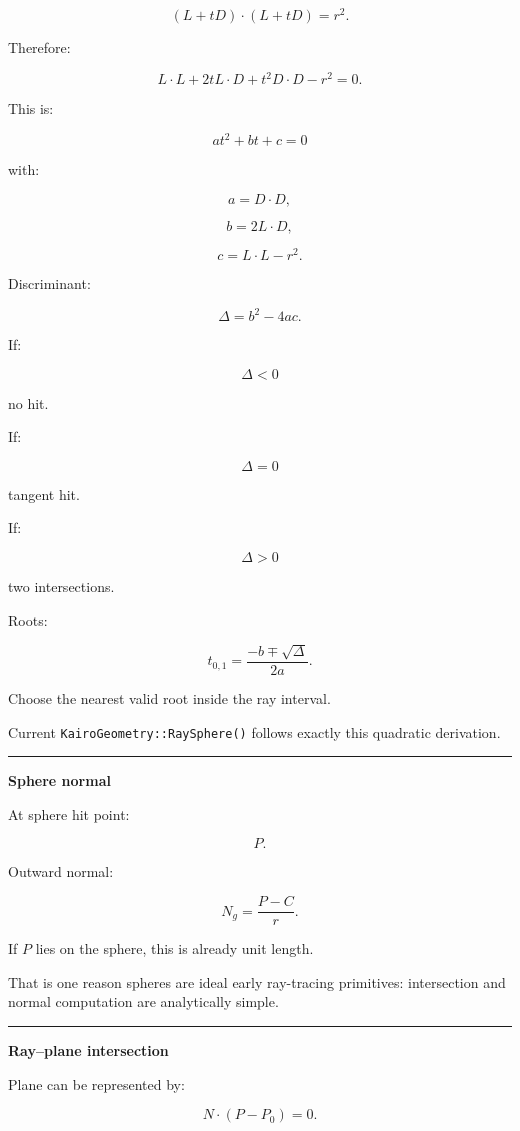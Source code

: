 \[
(L+tD)\cdot(L+tD)=r^2.
\]

Therefore:

\[
L\cdot L
+
2tL\cdot D
+
t^2D\cdot D
-
r^2
=
0.
\]

This is:

\[
\boxed{
at^2+bt+c=0
}
\]

with:

\[
a=D\cdot D,
\]

\[
b=2L\cdot D,
\]

\[
c=L\cdot L-r^2.
\]

Discriminant:

\[
\Delta=b^2-4ac.
\]

If:

\[
\Delta<0
\]

no hit.

If:

\[
\Delta=0
\]

tangent hit.

If:

\[
\Delta>0
\]

two intersections.

Roots:

\[
\boxed{
t_{0,1}
=
\frac{-b\mp\sqrt{\Delta}}{2a}.
}
\]

Choose the nearest valid root inside the ray interval.

Current \texttt{KairoGeometry::RaySphere()} follows exactly this quadratic derivation.

\begin{center}\rule{0.5\linewidth}{0.5pt}\end{center}

\textbf{Sphere normal}

At sphere hit point:

\[
P.
\]

Outward normal:

\[
\boxed{
N_g=
\frac{P-C}{r}.
}
\]

If \(P\) lies on the sphere, this is already unit length.

That is one reason spheres are ideal early ray-tracing primitives: intersection and normal computation are analytically simple.

\begin{center}\rule{0.5\linewidth}{0.5pt}\end{center}

\textbf{Ray--plane intersection}

Plane can be represented by:

\[
N\cdot(P-P_0)=0.
\]

